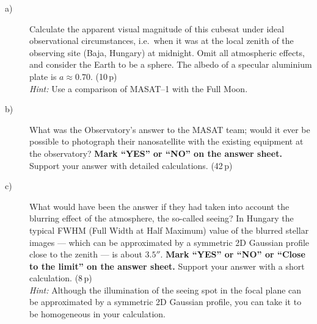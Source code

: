 \begin{description}
\item[a)] Calculate the apparent visual magnitude of this cubesat under ideal
  observational circumstances, i.e.\ when it was at the local zenith of the
  observing site (Baja, Hungary) at midnight. Omit all atmospheric effects, and
  consider the Earth to be a sphere. The albedo of a specular aluminium plate
  is $a \approx 0.70$. \hfill(10\,p)\\
  \textit{Hint:} Use a comparison of MASAT--1 with the Full Moon.
\item[b)] What was the Observatory's answer to the MASAT team; would it ever be
  possible to photograph their nanosatellite with the existing equipment at the
  observatory? \textbf{Mark ``YES'' or ``NO'' on the answer sheet.} Support
  your answer with detailed calculations. \hfill(42\,p)
\item[c)] What would have been the answer if they had taken into account the
  blurring effect of the atmosphere, the so-called seeing? In Hungary the
  typical FWHM (Full Width at Half Maximum) value of the blurred stellar images
  --- which can be approximated by a symmetric 2D Gaussian profile close to the
  zenith --- is about $3.5''$. \textbf{Mark ``YES'' or ``NO'' or ``Close to the
  limit'' on the answer sheet.} Support your answer with a short calculation.
  \hfill(8\,p)\\
  \textit{Hint:} Although the illumination of the seeing spot in the focal
  plane can be approximated by a symmetric 2D Gaussian profile, you can take it
  to be homogeneous in your calculation.
\end{description}
